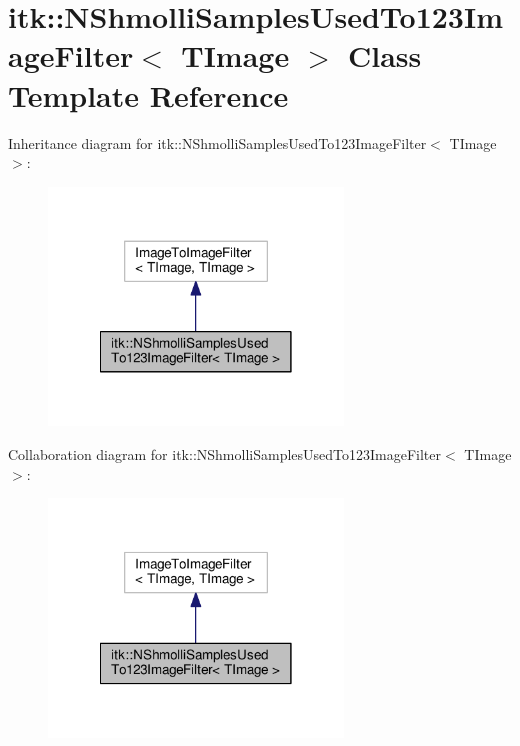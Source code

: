 \hypertarget{classitk_1_1_n_shmolli_samples_used_to123_image_filter}{\section{itk\-:\-:N\-Shmolli\-Samples\-Used\-To123\-Image\-Filter$<$ T\-Image $>$ Class Template Reference}
\label{classitk_1_1_n_shmolli_samples_used_to123_image_filter}
}


Inheritance diagram for itk\-:\-:N\-Shmolli\-Samples\-Used\-To123\-Image\-Filter$<$ T\-Image $>$\-:
\nopagebreak
\begin{figure}[H]
\begin{center}
\leavevmode
\includegraphics[width=222pt]{classitk_1_1_n_shmolli_samples_used_to123_image_filter__inherit__graph}
\end{center}
\end{figure}


Collaboration diagram for itk\-:\-:N\-Shmolli\-Samples\-Used\-To123\-Image\-Filter$<$ T\-Image $>$\-:
\nopagebreak
\begin{figure}[H]
\begin{center}
\leavevmode
\includegraphics[width=222pt]{classitk_1_1_n_shmolli_samples_used_to123_image_filter__coll__graph}
\end{center}
\end{figure}
